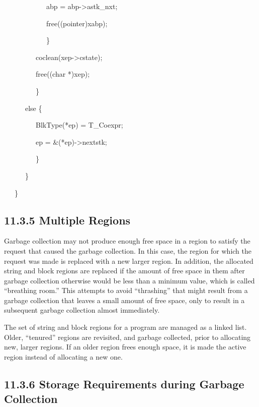 {\ttfamily\mdseries
\ \ \ \ \ \ \ \ \ \ \ \ abp = abp-{\textgreater}astk\_nxt;
}

{\ttfamily\mdseries
\ \ \ \ \ \ \ \ \ \ \ \ free((pointer)xabp);
}

{\ttfamily\mdseries
\ \ \ \ \ \ \ \ \ \ \ \ \}
}

{\ttfamily\mdseries
\ \ \ \ \ \ \ \ \ coclean(xep-{\textgreater}cstate); }

{\ttfamily\mdseries
\ \ \ \ \ \ \ \ \ free((char *)xep);}

{\ttfamily\mdseries
\ \ \ \ \ \ \ \ \ \}}

{\ttfamily\mdseries
\ \ \ \ \ \ else \{}

{\ttfamily\mdseries
\ \ \ \ \ \ \ \ \ BlkType(*ep) = T\_Coexpr;}

{\ttfamily\mdseries
\ \ \ \ \ \ \ \ \ ep = \&(*ep)-{\textgreater}nextstk;}

{\ttfamily\mdseries
\ \ \ \ \ \ \ \ \ \}}

{\ttfamily\mdseries
\ \ \ \ \ \ \}}

{\ttfamily\mdseries
\ \ \ \}}

\subsection[11.3.5 Multiple Regions]{11.3.5 Multiple Regions}

Garbage collection may not produce enough free space in a region to
satisfy the request that caused the garbage collection. In this case,
the region for which the request was made is replaced with a new
larger region. In addition, the allocated string and block regions are
replaced if the amount of free space in them after garbage collection
otherwise would be less than a minimum value, which is called
``breathing room.'' This attempts to avoid ``thrashing'' that might
result from a garbage collection that leaves a small amount of free
space, only to result in a subsequent garbage collection almost
immediately.

The set of string and block regions for a program are managed as a
linked list. Older, ``tenured'' regions are revisited, and garbage
collected, prior to allocating new, larger regions. If an older region
frees enough space, it is made the active region instead of allocating
a new one.

\subsection[11.3.6 Storage Requirements during Garbage Collection]{11.3.6 Storage Requirements during Garbage Collection}

